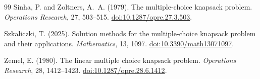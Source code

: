 \documentclass[11pt]{article}
\theoremstyle{plain}
\theoremstyle{definition}
\theoremstyle{remark}
\begin{document}
\begin{thebibliography}{99}
Sinha, P. and Zoltners, A.~A. (1979).
\newblock The multiple-choice knapsack problem.
\newblock \emph{Operations Research}, 27, 503--515.
\newblock \href{https://doi.org/10.1287/opre.27.3.503}{doi:10.1287/opre.27.3.503}.

Szkaliczki, T. (2025).
\newblock Solution methods for the multiple-choice knapsack problem and their applications.
\newblock \emph{Mathematics}, 13, 1097.
\newblock \href{https://doi.org/10.3390/math13071097}{doi:10.3390/math13071097}.

Zemel, E. (1980).
\newblock The linear multiple choice knapsack problem.
\newblock \emph{Operations Research}, 28, 1412--1423.
\newblock \href{https://doi.org/10.1287/opre.28.6.1412}{doi:10.1287/opre.28.6.1412}.

\end{thebibliography}
\end{document}
